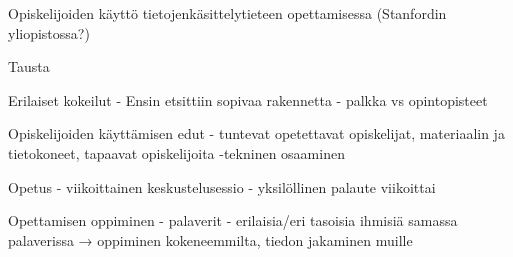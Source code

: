 ﻿Opiskelijoiden käyttö tietojenkäsittelytieteen opettamisessa (Stanfordin yliopistossa?)



Tausta

Erilaiset kokeilut
- Ensin etsittiin sopivaa rakennetta
- palkka vs opintopisteet

Opiskelijoiden käyttämisen edut
- tuntevat opetettavat opiskelijat, materiaalin ja tietokoneet, tapaavat opiskelijoita
-tekninen osaaminen

Opetus
- viikoittainen keskustelusessio
- yksilöllinen palaute viikoittai

Opettamisen oppiminen
- palaverit
- erilaisia/eri tasoisia ihmisiä samassa palaverissa → oppiminen kokeneemmilta, tiedon jakaminen muille
